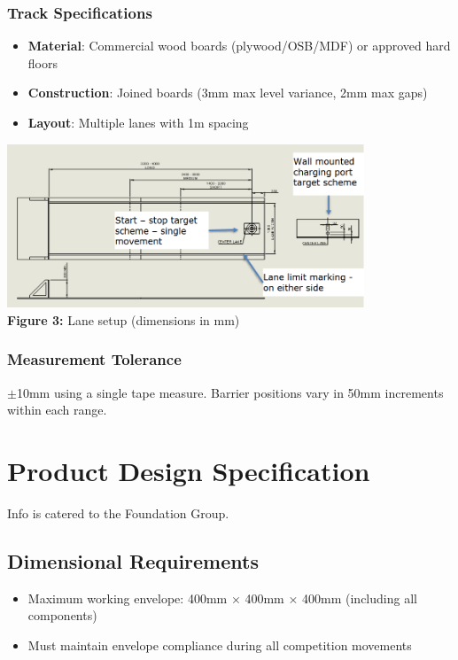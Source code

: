 \documentclass{article}
\begin{document}
\subsubsection*{Track Specifications}
\begin{itemize}[noitemsep,topsep=0pt]
	\item \textbf{Material}: Commercial wood boards (plywood/OSB/MDF) or approved hard floors
	\item \textbf{Construction}: Joined boards (3mm max level variance, 2mm max gaps)
	\item \textbf{Layout}: Multiple lanes with 1m spacing
\end{itemize}
\begin{center}
	\includegraphics[width=0.8\textwidth]{extracted_images/image_4_2.png}\\
	\small\textbf{Figure 3:} Lane setup (dimensions in mm)
\end{center}
\subsubsection*{Measurement Tolerance}
$\pm$10mm using a single tape measure. Barrier positions vary in 50mm increments within each range.

\newpage{}

\section{Product Design Specification}
Info is catered to the Foundation Group.
\subsection{Dimensional Requirements}
\begin{itemize}[itemsep=-0.7mm]
	\item Maximum working envelope: 400mm $\times$ 400mm $\times$ 400mm (including all components)
	\item Must maintain envelope compliance during all competition movements
\end{itemize}
\end{document}
